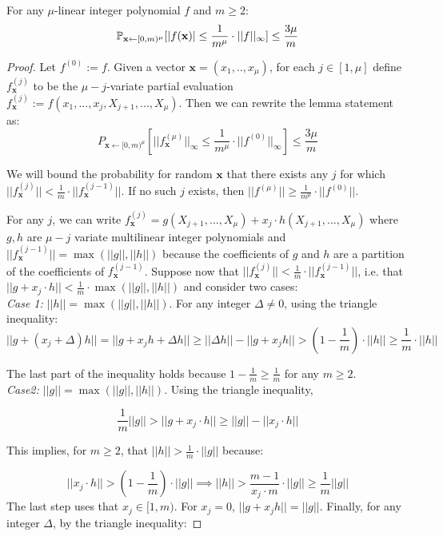\begin{lemma}\label{lem:evalbound} For any $\mu$-linear integer polynomial $f$ and $m \geq 2$:
 $$\mathbb{P}_{\mathbf{x} \gets [0,m)^\mu} [|f(\mathbf{x})|\leq \frac{1}{m^\mu} \cdot ||f||_\infty]\leq \frac{3\mu}{m}$$
 \end{lemma} 
 \begin{proof}
 Let $f^{(0)}:=f$. 
 Given a vector $\mathbf{x} = (x_1,..,x_\mu)$, for each $j\in[1,\mu]$ define $f_{\mathbf{x}}^{(j)}$ to be the $\mu-j$-variate partial evaluation $f_{\mathbf{x}}^{(j)}:= f(x_1,...,x_j, X_{j+1},...,X_\mu)$. Then we can rewrite the lemma statement as:
    $$P_{\mathbf{x} \gets [0,m)^\mu} [||f_{\mathbf{x}}^{(\mu)}||_\infty\leq  \frac{1}{m^\mu} \cdot ||f^{(0)}||_\infty ]\leq\frac{ 3\mu}{m}$$	
 
We will bound the probability for random $\mathbf{x}$ that there exists any $j$ for which $||f_{\mathbf{x}}^{(j)}|| < \frac{1}{m} \cdot ||f_{\mathbf{x}}^{(j-1)}||$. If no such $j$ exists, then $||f^{(\mu)}|| \geq \frac{1}{m^\mu} \cdot ||f^{(0)}||$. 

For any $j$, we can write $f_{\mathbf{x}}^{(j)} = g(X_{j+1},...,X_\mu) + x_{j}\cdot h(X_{j+1},...,X_\mu)$ where $g,h$ are $\mu-j$ variate multilinear integer polynomials and $||f_{\mathbf{x}}^{(j-1)}|| = \max(||g||, ||h||)$ because the coefficients of $g$ and $h$ are a partition of the coefficients of $f_{\mathbf{x}}^{(j-1)}$.  Suppose now that $||f_{\mathbf{x}}^{(j)}|| < \frac{1}{m} \cdot ||f_{\mathbf{x}}^{(j-1)}||$, i.e. that $||g + x_j \cdot h|| < \frac{1}{m} \cdot \max(||g||, ||h||)$ and consider two cases: \\

\emph{Case 1: $||h|| = \max(||g||, ||h||)$}.  For any integer $\Delta \neq 0$, using the triangle inequality: 
$$||g+(x_j +\Delta) h ||=||g + x_j h +\Delta h||\geq  ||\Delta h|| -  ||g + x_j h|| >  (1 - \frac{1}{m}) \cdot ||h|| \geq \frac{1}{m} \cdot ||h||   $$

The last part of the inequality holds because $1 - \frac{1}{m} \geq \frac{1}{m}$ for any $m \geq 2$. \\

\emph{Case2: $||g|| = \max(||g||, ||h||)$}. Using the triangle inequality, 

$$\frac{1}{m} ||g|| > ||g+x_j \cdot h || \geq  ||g|| - ||x_j \cdot h||$$ 

This implies, for $m \geq 2$, that $||h|| > \frac{1}{m} \cdot ||g||$ because:

$$||x_j \cdot h|| > (1 - \frac{1}{m}) \cdot ||g||\implies ||h||> \frac{m-1}{x_j \cdot m} \cdot ||g||\geq \frac{1}{m} ||g||$$
The last step uses that $x_j\in [1,m)$. For $x_j=0$, $||g +x_j h||=||g||$. 
Finally, for any integer $\Delta$, by the triangle inequality: 


\end{proof}
